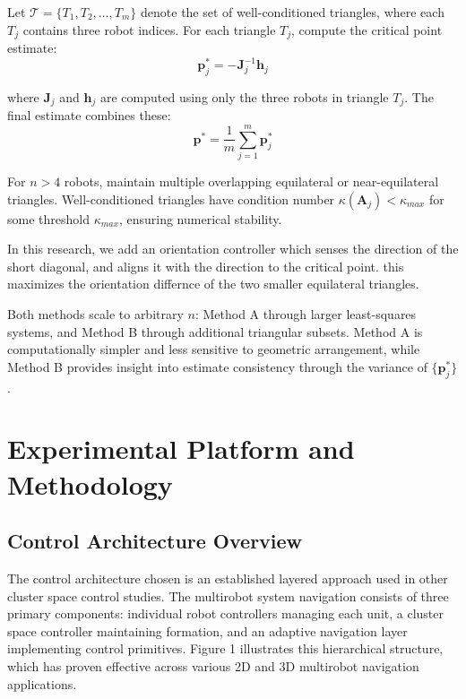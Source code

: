 \documentclass[lettersize,journal]{IEEEtran}
\begin{document}
Let $\mathcal{T} = \{T_1, T_2, \ldots, T_m\}$ denote the set of well-conditioned triangles, where each $T_j$ contains three robot indices. For each triangle $T_j$, compute the critical point estimate:
\begin{equation}
\mathbf{p}^*_j = -\mathbf{J}_j^{-1}\mathbf{h}_j
\end{equation}

where $\mathbf{J}_j$ and $\mathbf{h}_j$ are computed using only the three robots in triangle $T_j$. The final estimate combines these:
\begin{equation}
\mathbf{p}^* = \frac{1}{m}\sum_{j=1}^{m} \mathbf{p}^*_j
\end{equation}

For $n > 4$ robots, maintain multiple overlapping equilateral or near-equilateral triangles. Well-conditioned triangles have condition number $\kappa(\mathbf{A}_j) < \kappa_{max}$ for some threshold $\kappa_{max}$, ensuring numerical stability.

In this research, we add an orientation controller which senses the direction of the short diagonal, and aligns it with the direction to the critical point. this maximizes the orientation differnce of the two smaller equilateral triangles.

Both methods scale to arbitrary $n$: Method A through larger least-squares systems, and Method B through additional triangular subsets. Method A is computationally simpler and less sensitive to geometric arrangement, while Method B provides insight into estimate consistency through the variance of $\{\mathbf{p}^*_j\}$.

\section{Experimental Platform and Methodology}

\subsection{Control Architecture Overview}

The control architecture chosen is an established layered approach used in other cluster space control studies. The multirobot system navigation consists of three primary components: individual robot controllers managing each unit, a cluster space controller maintaining formation, and an adaptive navigation layer implementing control primitives. Figure 1 illustrates this hierarchical structure, which has proven effective across various 2D and 3D multirobot navigation applications.
\end{document}
